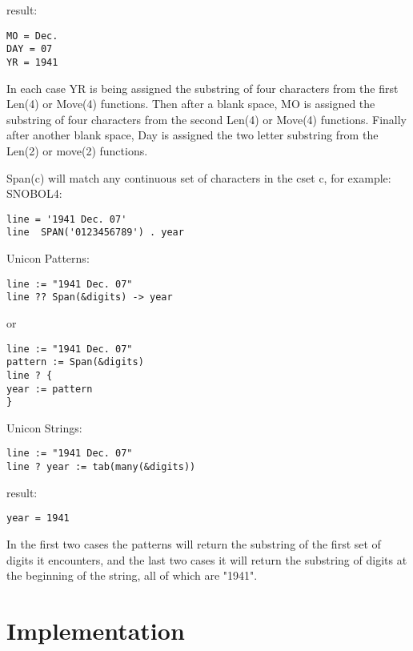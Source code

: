 \documentclass{article}
\begin{document}
\noindent
result:
\begin{verbatim}
MO = Dec.
DAY = 07
YR = 1941
\end{verbatim}

In each case YR is being assigned the substring of four characters from the first Len(4) or Move(4) functions.  Then after a blank space, MO is assigned the substring of four characters from the second Len(4) or Move(4) functions.  Finally after another blank space, Day is assigned the two letter substring from the Len(2) or move(2) functions.

\pagebreak
Span(c) will match any continuous set of characters in the cset c, for example:\\

\noindent
SNOBOL4:
\begin{verbatim}
line = '1941 Dec. 07'
line  SPAN('0123456789') . year
\end{verbatim}

\noindent
Unicon Patterns:
\begin{verbatim}
line := "1941 Dec. 07"
line ?? Span(&digits) -> year
\end{verbatim}
or
\begin{verbatim}
line := "1941 Dec. 07"
pattern := Span(&digits)
line ? {
year := pattern
}
\end{verbatim}

\noindent
Unicon Strings:
\begin{verbatim}
line := "1941 Dec. 07"
line ? year := tab(many(&digits))
\end{verbatim}

\noindent
result:
\begin{verbatim}
year = 1941
\end{verbatim}

In the first two cases the patterns will return the substring of the first set of digits it encounters, and the last two cases it will return the substring of digits at the beginning of the string, all of which are "1941".


\section{Implementation}

\pagebreak


\end{document}
